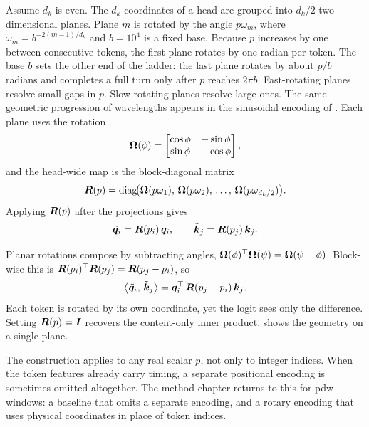Assume $d_k$ is even. The $d_k$ coordinates of a head are grouped into $d_k/2$ two-dimensional planes. Plane $m$ is rotated by the angle $p\omega_m$, where $\omega_m = b^{-2(m-1)/d_k}$ and $b=10^4$ is a fixed base.
Because $p$ increases by one between consecutive tokens, the first plane rotates by one radian per token.
The base $b$ sets the other end of the ladder: the last plane rotates by about $p/b$ radians and completes a full turn only after $p$ reaches $2\pi b$.
Fast-rotating planes resolve small gaps in $p$. Slow-rotating planes resolve large ones. The same geometric progression of wavelengths appears in the sinusoidal encoding of \textcite{vaswani2017attention}.
Each plane uses the rotation
\begin{equation}\label{eq:bg:rope_2d}
  \bm{\Omega}(\phi) =
  \begin{bmatrix}
    \cos\phi & -\sin\phi \\
    \sin\phi & \phantom{-}\cos\phi
  \end{bmatrix},
\end{equation}
and the head-wide map is the block-diagonal matrix
\begin{equation}\label{eq:bg:rope_block}
  \bm{R}(p)
  = \operatorname{diag}\!\bigl(
      \bm{\Omega}(p\omega_1),\,
      \bm{\Omega}(p\omega_2),\,
      \ldots,\,
      \bm{\Omega}(p\omega_{d_k/2})
    \bigr).
\end{equation}
Applying $\bm{R}(p)$ after the projections gives
\begin{equation}\label{eq:bg:rope_map}
  \tilde{\bm{q}}_i = \bm{R}(p_i)\,\bm{q}_i,
  \qquad
  \tilde{\bm{k}}_j = \bm{R}(p_j)\,\bm{k}_j.
\end{equation}

Planar rotations compose by subtracting angles, $\bm{\Omega}(\phi)^{\top}\bm{\Omega}(\psi) = \bm{\Omega}(\psi - \phi)$. Block-wise this is $\bm{R}(p_i)^{\top}\bm{R}(p_j) = \bm{R}(p_j - p_i)$, so
\begin{equation}\label{eq:bg:rope}
  \bigl\langle \tilde{\bm{q}}_i,\, \tilde{\bm{k}}_j \bigr\rangle
    = \bm{q}_i^{\top}\,\bm{R}(p_j - p_i)\,\bm{k}_j.
\end{equation}
Each token is rotated by its own coordinate, yet the logit sees only the difference. Setting $\bm{R}(p) = \bm{I}$ recovers the content-only inner product.  shows the geometry on a single plane.

The construction applies to any real scalar $p$, not only to integer indices. When the token features already carry timing, a separate positional encoding is sometimes omitted altogether. The method chapter returns to this for \gls{pdw} windows: a baseline that omits a separate encoding, and a rotary encoding that uses physical coordinates in place of token indices.

